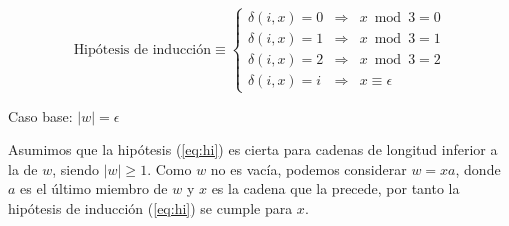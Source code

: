\documentclass[a4paper]{article}
\begin{document}
  		\begin{equation}
  			\text{Hipótesis de inducción} \equiv \left\{
  			\begin{array}{rcl}
  				\delta(i, x) = 0 &\Rightarrow& x\bmod3=0 \\
  				\delta(i, x) = 1 &\Rightarrow& x\bmod3=1 \\
  				\delta(i, x) = 2 &\Rightarrow& x\bmod3=2 \\
  				\delta(i, x) = i &\Rightarrow& x\equiv\epsilon
  				\end{array}\right.
  			\label{eq:hi}
  		\end{equation}

  		Caso base: $|w|=\epsilon$

  		Asumimos que la hipótesis (\ref{eq:hi}) es cierta para cadenas de longitud inferior a la de $w$, siendo $|w|\geq1$. Como $w$ no es vacía, podemos considerar $w=xa$, donde $a$ es el último miembro de $w$ y $x$ es la cadena que la precede, por tanto la hipótesis de inducción (\ref{eq:hi}) se cumple para $x$.
\end{document}
